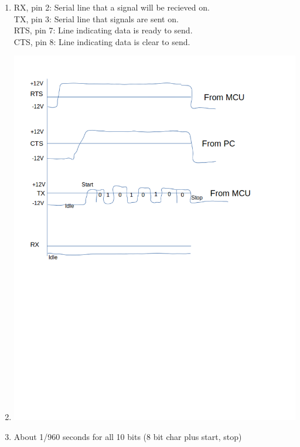\documentclass{jhwhw}
\begin{document}
\problem{}
\begin{enumerate}
\item RX, pin 2: Serial line that a signal will be recieved on. \\
TX, pin 3: Serial line that signals are sent on. \\
RTS, pin 7: Line indicating data is ready to send. \\
CTS, pin 8: Line indicating data is clear to send.
\item \includegraphics[scale=0.50]{HW1-1.png}
\item About 1/960 seconds for all 10 bits (8 bit char plus start, stop)
\end{enumerate}
\end{document}
